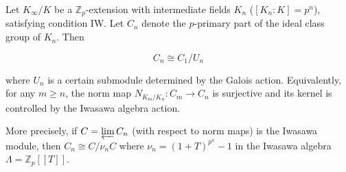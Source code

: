 Let $K_\infty / K$ be a $\mathbb{Z}_p$-extension with intermediate fields $K_n$ ($[K_n : K] = p^n$), satisfying condition IW. Let $C_n$ denote the $p$-primary part of the ideal class group of $K_n$. Then

$$C_n \cong C_1 / U_n$$

where $U_n$ is a certain submodule determined by the Galois action. Equivalently, for any $m \geq n$, the norm map $N_{K_m/K_n}: C_m \to C_n$ is surjective and its kernel is controlled by the Iwasawa algebra action.

More precisely, if $C = \varprojlim C_n$ (with respect to norm maps) is the Iwasawa module, then $C_n \cong C / \nu_n C$ where $\nu_n = (1+T)^{p^n} - 1$ in the Iwasawa algebra $\Lambda = \mathbb{Z}_p[[T]]$.
